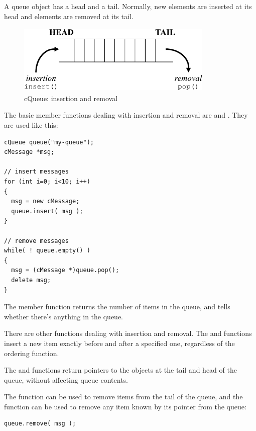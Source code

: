 A queue object has a head and a tail. Normally, new elements
are inserted at its head and elements are removed at its tail.


\begin{figure}[htbp]
  \begin{center}
    \includegraphics[width=3.703in, height=1.303in]{figures/usmanFig10}
    \caption{cQueue: insertion and removal}
    \label{fig:ch-sim-lib:cqueue}
  \end{center}
\end{figure}

The basic  member functions dealing with insertion and removal
are  and . They are used
like this:

\begin{verbatim}
cQueue queue("my-queue");
cMessage *msg;

// insert messages
for (int i=0; i<10; i++)
{
  msg = new cMessage;
  queue.insert( msg );
}

// remove messages
while( ! queue.empty() )
{
  msg = (cMessage *)queue.pop();
  delete msg;
}
\end{verbatim}


The  member function returns the number of items in the
queue, and  tells whether there's anything in the queue.

There are other functions dealing with insertion and removal.  The
 and  functions insert a
new item exactly before and after a specified one, regardless of the
ordering function.

The  and  functions return pointers to the objects
at the tail and head of the queue, without affecting queue contents.

The  function can be used to remove items from the
tail of the queue, and the  function can be
used to remove any item known by its pointer from the queue:

\begin{verbatim}
queue.remove( msg );
\end{verbatim}




